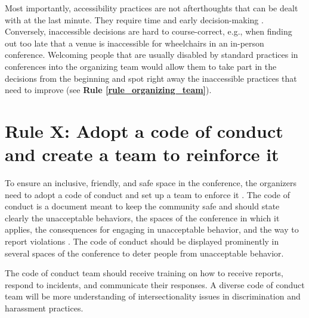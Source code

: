 \documentclass[10pt,letterpaper]{article}
\begin{document}
Most importantly, accessibility practices are not afterthoughts that can be dealt with at the last minute. 
They require time and early decision-making \cite{irishIncreasingParticipationUsing2020}. 
Conversely, inaccessible decisions are hard to course-correct, e.g., when finding out too late that a venue is inaccessible for wheelchairs in an in-person conference. 
Welcoming people that are usually disabled by standard practices in conferences into the organizing team would allow them to take part in the decisions from the beginning and spot right away the inaccessible practices that need to improve (see \textbf{Rule \ref{rule_organizing_team}}). 


\section{Rule X: Adopt a code of conduct and create a team to reinforce it}
\label{rule_CoC}

To ensure an inclusive, friendly, and safe space in the conference, the organizers need to adopt a code of conduct and set up a team to enforce it \cite{favaroYourScienceConference2016}. The code of conduct is a document meant to keep the community safe and should state clearly the unacceptable behaviors, the spaces of the conference in which it applies, the consequences for engaging in unacceptable behavior, and the way to report violations \cite{auroraHowRespondCode2018}. 
The code of conduct should be displayed prominently in several spaces of the conference to deter people from unacceptable behavior.

The code of conduct team should receive training on how to receive reports, respond to incidents, and communicate their responses. A diverse code of conduct team will be more understanding of intersectionality issues in discrimination and harassment practices. 
\end{document}
